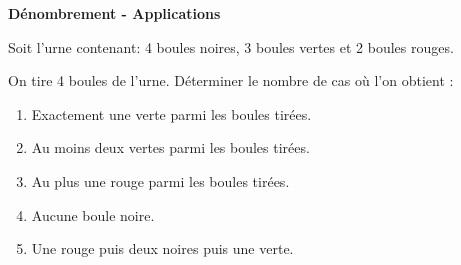 \documentclass[12pt,a4paper]{article}
\begin{document}
\begin{enumerate}[label=\Roman*., font=\bfseries\color{red}]
\begin{enumerate}
\end{enumerate}

\textbf{Dénombrement - Applications}

Soit l'urne contenant: 4 boules noires, 3 boules vertes et 2 boules rouges.


On tire 4 boules de l'urne. Déterminer le nombre de cas où l'on obtient :

\begin{enumerate}
    \item Exactement une verte parmi les boules tirées.
    \item Au moins deux vertes parmi les boules tirées.
    \item Au plus une rouge parmi les boules tirées.
    \item Aucune boule noire.
    \item Une rouge puis deux noires puis une verte.
\end{enumerate}

\renewcommand{\arraystretch}{2} %


\end{enumerate}
\end{document}

